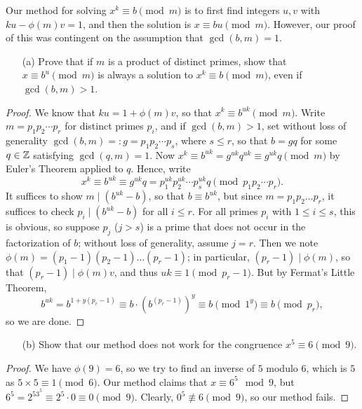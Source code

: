 \documentclass{article}
\begin{document}
\begin{exercise}[Chapter 17, \#4]
Our method for solving $x^k\equiv b\pmod m$ is to first find integers $u,v$ with $ku - \phi(m)v = 1$, and then the solution is $x\equiv bu\pmod m$. However, our proof of this was contingent on the assumption that $\gcd(b,m) = 1$.
\begin{itemize}
    \item[(a)] Prove that if $m$ is a product of distinct primes, show that $x\equiv b^u\pmod m$ is always a solution to $x^k\equiv b\pmod m$, even if $\gcd(b, m) > 1$.
\end{itemize}
\begin{proof}
We know that $ku = 1 + \phi(m)v$, so that $x^k \equiv b^{uk}\pmod m$. Write $m = p_1p_2\cdots p_r$ for distinct primes $p_i$, and if $\gcd(b,m) > 1$, set without loss of generality $\gcd(b,m) =: g = p_1p_2\cdots p_s$, where $s\leq r$, so that $b = gq$ for some $q\in\mathbb Z$ satisfying $\gcd(q, m) = 1$. Now $x^k\equiv b^{uk} = g^{uk}q^{uk} \equiv g^{uk}q \pmod{m}$ by Euler's Theorem applied to $q$. Hence, write
$$x^k \equiv b^{uk} \equiv g^{uk}q = p_1^{uk}p_2^{uk}\cdots p_s^{uk}q \pmod{p_1p_2\cdots p_r}.$$
It suffices to show $m \mid (b^{uk} - b)$, so that $b \equiv b^{uk}$, but since $m = p_1p_2\ldots p_r$, it suffices to check $p_i\mid (b^{uk}-b)$ for all $i \leq r$. For all primes $p_i$ with $1\leq i\leq s$, this is obvious, so suppose $p_j$ ($j>s$) is a prime that does not occur in the factorization of $b$; without loss of generality, assume $j=r$. Then we note $\phi(m) = (p_1-1)(p_2-1)\ldots (p_r-1)$; in particular, $(p_r-1)\mid\phi(m)$, so that $(p_r-1) \mid \phi(m)v$, and thus $uk \equiv 1\pmod{p_r-1}$. But by Fermat's Little Theorem,
$$b^{uk} = b^{1 + y(p_r-1)} \equiv b\cdot (b^{(p_r-1)})^y \equiv b\pmod 1^y \equiv b\pmod{p_r},$$
so we are done.
\end{proof}

\begin{itemize}
    \item[(b)] Show that our method does not work for the congruence $x^5\equiv 6\pmod 9$.
\end{itemize}
\begin{proof}
We have $\phi(9) = 6$, so we try to find an inverse of $5$ modulo $6$, which is $5$ as $5\times 5\equiv 1\pmod 6$. Our method claims that $x\equiv 6^5\mod 9$, but $6^5 = 2^53^5\equiv 2^5\cdot 0 \equiv 0\pmod 9$. Clearly, $0^5\not\equiv 6\pmod 9$, so our method fails.
\end{proof}
\end{exercise}
\end{document}
